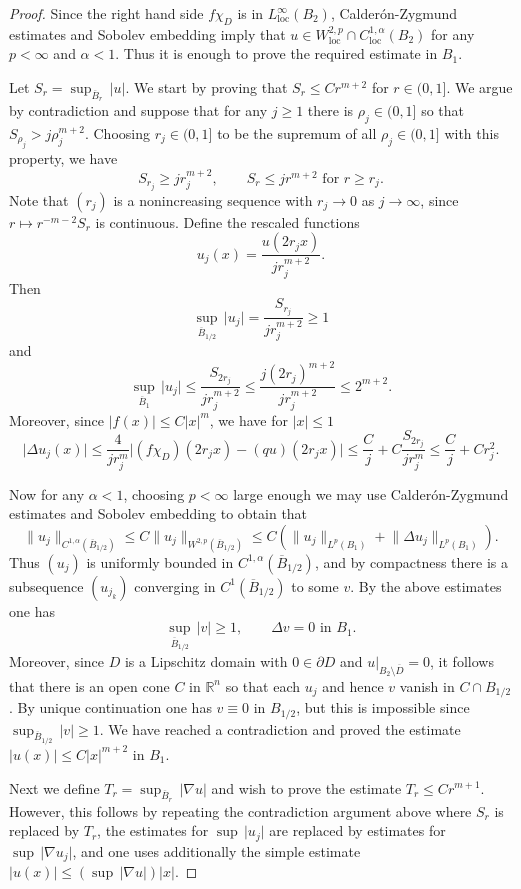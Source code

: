 \documentclass[11pt,a4paper]{amsart}
\theoremstyle{definition}
\numberwithin{equation}{section}
\newcommand{\mR}{\mathbb{R}}                    %
\newcommand{\abs}[1]{\lvert #1 \rvert}          %
\newcommand{\norm}[1]{\lVert #1 \rVert}         %
\newcommand{\ol}[1]{\overline{#1}}
\newcommand{\p}{\partial}
\begin{document}
\begin{proof}
Since the right hand side $f \chi_D$ is in $L^{\infty}_{\mathrm{loc}}(B_2)$, Calder\'on-Zygmund estimates and Sobolev embedding imply that $u \in W^{2,p}_{\mathrm{loc}} \cap C^{1,\alpha}_{\mathrm{loc}}(B_2)$ for any $p < \infty$ and $\alpha < 1$. Thus it is enough to prove the required estimate in $B_1$.

Let $S_r = \sup_{\ol{B}_r} \,\abs{u}$. We start by proving that $S_r \leq C r^{m+2}$ for $r \in (0,1]$. We argue by contradiction and suppose that for any $j \geq 1$ there is $\rho_j \in (0,1]$ so that $S_{\rho_j} > j \rho_{j}^{m+2}$. Choosing $r_j \in (0,1]$ to be the supremum of all $\rho_j \in (0,1]$ with this property, we have 
\begin{equation} \label{sr_opposite}
S_{r_j} \geq j r_{j}^{m+2}, \qquad S_r \leq j r^{m+2} \text{ for $r \geq r_j$}.
\end{equation}
Note that $(r_j)$ is a nonincreasing sequence with $r_j \to 0$ as $j \to \infty$, since $r \mapsto r^{-m-2} S_r$ is continuous. Define the rescaled functions 
\[
u_j(x) = \frac{u(2 r_{j} x)}{j r_{j}^{m+2}}.
\]
Then 
\[
\sup_{\ol{B}_{1/2}} \,\abs{u_j} = \frac{S_{r_j}}{j r_{j}^{m+2}} \geq 1
\]
and 
\[
\sup_{\ol{B}_{1}} \,\abs{u_j} \leq \frac{S_{2 r_j}}{j r_{j}^{m+2}} \leq \frac{j(2r_j)^{m+2}}{j r_j^{m+2}} \leq 2^{m+2}.
\]
Moreover, since $\abs{f(x)} \leq C \abs{x}^m$, we have for $\abs{x} \leq 1$ 
\[
\abs{\Delta u_j(x)} \leq \frac{4}{j r_{j}^m} \abs{(f\chi_D)(2 r_{j} x) - (q u)(2 r_{j} x)} \leq \frac{C}{j} + C \frac{S_{2 r_j}}{j r_j^m} \leq \frac{C}{j} + C r_j^2.
\]

Now for any $\alpha < 1$, choosing $p < \infty$ large enough we may use Calder\'on-Zygmund estimates and Sobolev embedding to obtain that 
\[
\norm{u_j}_{C^{1,\alpha}(\ol{B}_{1/2})} \leq C \norm{u_j}_{W^{2,p}(\ol{B}_{1/2})} \leq C(\norm{u_j}_{L^p(B_1)} + \norm{\Delta u_j}_{L^p(B_1)}).
\]
Thus $(u_j)$ is uniformly bounded in $C^{1,\alpha}(\ol{B}_{1/2})$, and by compactness there is a subsequence $(u_{j_k})$ converging in $C^1(\ol{B}_{1/2})$ to some $v$. By the above estimates one has 
\[
\sup_{\ol{B}_{1/2}} \,\abs{v} \geq 1, \qquad \Delta v = 0 \text{ in $B_1$}.
\]
Moreover, since $D$ is a Lipschitz domain with $0 \in \p D$ and $u|_{B_2 \setminus \ol{D}} = 0$, it follows that there is an open cone $C$ in $\mR^n$ so that each $u_j$ and hence $v$ vanish in $C \cap B_{1/2}$. By unique continuation one has $v \equiv 0$ in $B_{1/2}$, but this is impossible since $\sup_{\ol{B}_{1/2}} \,\abs{v} \geq 1$. We have reached a contradiction and proved the estimate $\abs{u(x)} \leq C \abs{x}^{m+2}$ in $B_1$.

Next we define $T_r = \sup_{\ol{B}_r} \, \abs{\nabla u}$ and wish to prove the estimate $T_r \leq C r^{m+1}$. However, this follows by repeating the contradiction argument above where $S_r$ is replaced by $T_r$, the estimates for $\sup\,\abs{u_j}$ are replaced by estimates for $\sup\,\abs{\nabla u_j}$, and one uses additionally the simple estimate $\abs{u(x)} \leq (\sup\,\abs{\nabla u}) \abs{x}$.
\end{proof}
\end{document}
